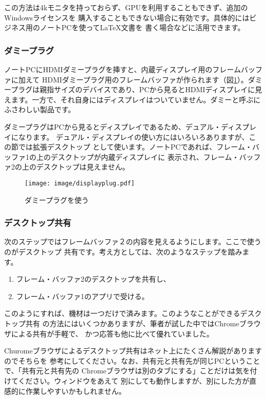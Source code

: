 この方法は4kモニタを持っておらず、GPUを利用することもできず、追加のWindowsライセンスを
購入することもできない場合に有効です。具体的にはビジネス用のノートPCを使って\LaTeX 文書を
書く場合などに活用できます。
\subsubsection{ダミープラグ}
ノートPCにHDMIダミープラグを挿すと、内蔵ディスプレイ用のフレームバッファに加えて
HDMIダミープラグ用のフレームバッファが作られます（図\ref{fig:display-plug}）。ダミープラグは親指サイズのデバイスであり、PCから見るとHDMIディスプレイに見えます。一方で、それ自身にはディスプレイはついていません。ダミーと呼ぶにふさわしい製品です。

ダミープラグはPCから見るとディスプレイであるため、デュアル・ディスプレイになります。
デュアル・ディスプレイの使い方にはいろいろありますが、この節では拡張デスクトップ
として使います。ノートPCであれば、フレーム・バッファ1の上のデスクトップが内蔵ディスプレイに
表示され、フレーム・バッファ2の上のデスクトップは見えません。


\begin{figure}[btp]
  \begin{center}
    \texttt{[image: image/displayplug.pdf]}
    \caption{ダミープラグを使う} \label{fig:display-plug}
  \end{center}
\end{figure}


\subsubsection{デスクトップ共有}
次のステップではフレームバッファ２の内容を見えるようにします。ここで使うのがデスクトップ
共有です。考え方としては、次のようなステップを踏みます。

\begin{enumerate}
  \item フレーム・バッファ2のデスクトップを共有し、
  \item フレーム・バッファ1のアプリで受ける。
\end{enumerate}

このようにすれば、機材は一つだけで済みます。このようなことができるデスクトップ共有
の方法にはいくつかありますが、筆者が試した中ではChromeブラウザによる共有が手軽で、
かつ応答も他に比べて優れていました。

Churomeブラウザによるデスクトップ共有はネット上にたくさん解説がありますのでそちらを
参考にしてください。なお、共有元と共有先が同じPCということで、「共有元と共有先の
Chromeブラウザは別のタブにする」ことだけは気を付けてください。ウィンドウをあえて
別にしても動作しますが、別にした方が直感的に作業しやすいかもしれません。

